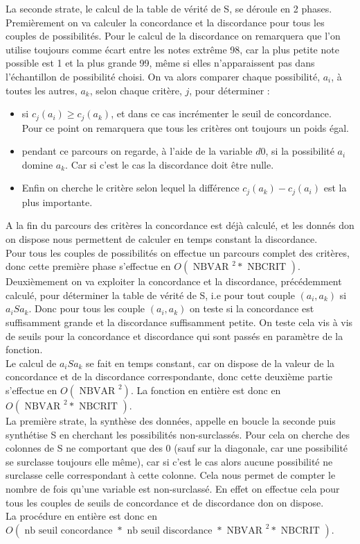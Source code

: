 \documentclass[12pt,a4paper]{article}
\begin{document}
La seconde strate, le calcul de la table de vérité de S, se déroule en 2 phases.\\
Premièrement on va calculer la concordance et la discordance pour tous les couples de possibilités. Pour le calcul de la discordance on remarquera que l'on utilise toujours comme écart entre les notes extrême 98, car la plus petite note possible est 1 et la plus grande 99, même si elles n’apparaissent pas dans l’échantillon de possibilité choisi. On va alors comparer chaque possibilité, $a_i$, à toutes les autres, $a_k$, selon chaque critère, $j$, pour déterminer :
\begin{itemize}
\item
si $c_j(a_i) \geqslant c_j(a_k)$, et dans ce cas incrémenter le seuil de concordance. Pour ce point on remarquera que tous les critères ont toujours un poids égal.
\item
pendant ce parcours on regarde, à l'aide de la variable $d0$, si la possibilité $a_i$ domine $a_k$. Car si c'est le cas la discordance doit être nulle.
\item
Enfin on cherche le critère selon lequel la différence $c_j(a_k) - c_j(a_i)$ est la plus importante.
\end{itemize}
A la fin du parcours des critères la concordance est déjà calculé, et les donnés don on dispose nous permettent de calculer en temps constant la discordance.\\
Pour tous les couples de possibilités on effectue un parcours complet des critères, donc cette première phase s’effectue en $O(\text{ NBVAR }^2 * \text{ NBCRIT })$.\\
Deuxièmement on va exploiter la concordance et la discordance, précédemment calculé, pour déterminer la table de vérité de S, i.e pour tout couple $( a_i , a_k )$ si $a_i S a_k$. Donc pour tous les couple $( a_i , a_k )$ on teste si la concordance est suffisamment grande et la discordance suffisamment petite. On teste cela vis à vis de seuils pour la concordance et discordance qui sont passés en paramètre de la fonction.\\
Le calcul de $a_i S a_k$ se fait en temps constant, car on dispose de la valeur de la concordance et de la discordance correspondante, donc cette deuxième partie s'effectue en $O(\text{ NBVAR }^2)$. La fonction en entière est donc en $O(\text{ NBVAR }^2 * \text{ NBCRIT })$.\\

La première strate, la synthèse des données, appelle en boucle la seconde puis synthétise S en cherchant les possibilités non-surclassés. Pour cela on cherche des colonnes de S ne comportant que des 0 (sauf sur la diagonale, car une possibilité se surclasse toujours elle même), car si c'est le cas alors aucune possibilité ne surclasse celle correspondant à cette colonne. Cela nous permet de compter le nombre de fois qu'une variable est non-surclassé. En effet on effectue cela pour tous les couples de seuils de concordance et de discordance don on dispose.\\
La procédure en entière est donc en $O(\text{ nb seuil concordance } * \text{ nb seuil discordance } * \text{ NBVAR }^2 * \text{ NBCRIT })$.
\end{document}
